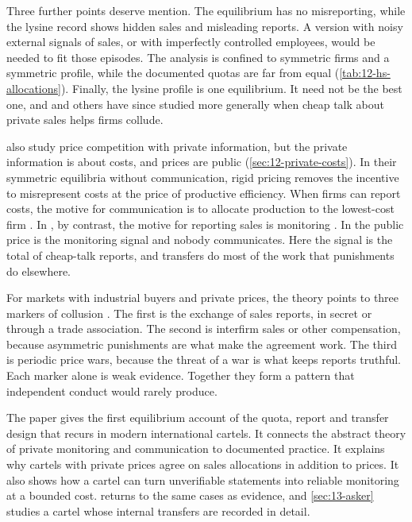 Three further points deserve mention. The equilibrium has no misreporting, while the lysine record shows hidden
sales and misleading reports. A version with noisy external signals of sales, or with imperfectly controlled
employees, would be needed to fit those episodes. The analysis is confined to symmetric firms and a symmetric
profile, while the documented quotas are far from equal (\cref{tab:12-hs-allocations}). Finally, the lysine profile
is one equilibrium. It need not be the best one, and \citet{AwayaKrishna2016} and others have since studied more
generally when cheap talk about private sales helps firms collude.

\citet{AtheyBagwellSanchirico2004} also study price competition with private information, but the private
information is about costs, and prices are public (\cref{sec:12-private-costs}). In their symmetric equilibria
without communication, rigid pricing removes the incentive to misrepresent costs at the price of productive
efficiency. When firms can report costs, the motive for communication is to allocate production to the lowest-cost
firm \citep{AtheyBagwell2001}. In \citet{HarringtonSkrzypacz2011}, by contrast, the motive for reporting sales is
monitoring \citep[p.~2431]{HarringtonSkrzypacz2011}. In \citet{GreenPorter1984} the public price is the monitoring
signal and nobody communicates. Here the signal is the total of cheap-talk reports, and transfers do most of the
work that punishments do elsewhere.

For markets with industrial buyers and private prices, the theory points to three markers of collusion
\citep[p.~2442]{HarringtonSkrzypacz2011}. The first is the exchange of sales reports, in secret or through a trade
association. The second is interfirm sales or other compensation, because asymmetric punishments are what make the
agreement work. The third is periodic price wars, because the threat of a war is what keeps reports truthful.
Each marker alone is weak evidence. Together they form a pattern that independent conduct would rarely produce.

The paper gives the first equilibrium account of the quota, report and transfer design that recurs in modern
international cartels. It connects the abstract theory of private monitoring and communication to documented
practice. It explains why cartels with private prices agree on sales allocations in addition to prices. It also
shows how a cartel can turn unverifiable statements into reliable monitoring at a bounded
cost.  returns to the same cases as evidence, and \cref{sec:13-asker} studies a
cartel whose internal transfers are recorded in detail.

